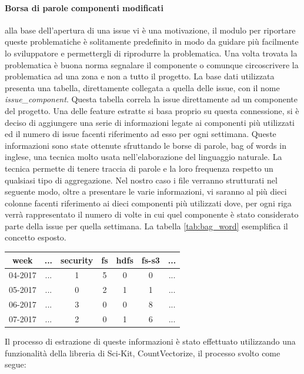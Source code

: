 \documentclass[%
    corpo=12pt,
    twoside,
    oldstyle,
    autoretitolo,
    greek,
    evenboxes,
]{toptesi}
\begin{document}
\paragraph{Borsa di parole componenti modificati} alla base dell'apertura di una issue vi è una motivazione, il modulo per riportare queste problematiche è solitamente predefinito in modo da guidare più facilmente lo sviluppatore e permettergli di riprodurre la problematica. Una volta trovata la problematica è buona norma segnalare il componente o comunque circoscrivere la problematica ad una zona e non a tutto il progetto. La base dati utilizzata presenta una tabella, direttamente collegata a quella delle issue, con il nome \textit{issue\_component}. Questa tabella correla la issue direttamente ad un componente del progetto. Una delle feature estratte si basa proprio su questa connessione, si è deciso di aggiungere una serie di informazioni legate ai componenti più utilizzati ed il numero di issue facenti riferimento ad esso per ogni settimana. Queste informazioni sono state ottenute sfruttando le borse di parole, bag of words in inglese, una tecnica molto usata nell'elaborazione del linguaggio naturale. La tecnica permette di tenere traccia di parole e la loro frequenza respetto un qualsiasi tipo di aggregazione. Nel nostro caso i file verranno strutturati nel seguente modo, oltre a presentare le varie informazioni, vi saranno al più dieci colonne facenti riferimento ai dieci componenti più utilizzati dove, per ogni riga verrà rappresentato il numero di volte in cui quel componente è stato considerato parte della issue per quella settimana. La tabella \ref{tab:bag_word} esemplifica il concetto esposto.
\begin{center}
   \label{tab:bag_word}
  \begin{tabular}{ |c|c|c|c|c|c|c| }
     \hline
     \textbf{week} & \textbf{...} & \textbf{security} & \textbf{fs} & \textbf{hdfs} & \textbf{fs-s3} & \textbf{...} \\
     \hline
     \hline
     04-2017 & ... & 1 & 5 & 0 & 0 & ...\\
     \hline
     05-2017 & ... & 0 & 2 & 1 & 1 & ...\\
     \hline
     06-2017 & ... & 3 & 0 & 0 & 8 & ...\\
     \hline
     07-2017 & ... & 2 & 0 & 1 & 6 & ...\\
     \hline
  \end{tabular}
\end{center}
Il processo di estrazione di queste informazioni è stato effettuato utilizzando una funzionalità della libreria di Sci-Kit, CountVectorize, il processo svolto come segue:
\end{document}

